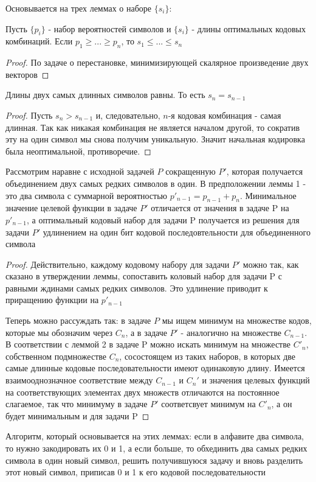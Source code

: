 \documentclass[discrete.tex]{subfiles}
\begin{document}
\begin{sol}
  Основывается на трех леммах о наборе $\{s_i\}$:
  \begin{lemma}[1]
    Пусть $\{p_i\}$ - набор вероятностей символов и $\{s_i\}$ - длины оптимальных кодовых комбинаций. Если $p_1 \geq ... \geq p_n$, то $s_1 \leq ... \leq s_n$
  \end{lemma}

  \begin{proof}
    По задаче о перестановке, минимизирующей скалярное произведение двух векторов
  \end{proof}

  \begin{lemma}[2]
    Длины двух самых длинных символов равны. То есть $s_n = s_{n-1}$
  \end{lemma}

  \begin{proof}
    Пусть $s_n > s_{n-1}$ и, следовательно, $n$-я кодовая комбинация - самая длинная. Так как никакая комбинация не является началом другой, то сократив эту на один символ мы снова получим уникальную. Значит начальная кодировка была неоптимальной, противоречие.
  \end{proof}

  \begin{lemma}[3]
    Рассмотрим наравне с исходной задачей $P$ сокращенную $P'$,  которая получается объединением двух самых редких символов в один. В предположении леммы 1 - это два символа с суммарной вероятностью $p'_{n-1} = p_{n-1} + p_n$. Минимальное значение целевой функции в задаче $P'$ отличается от значения в задаче P на $p'_{n-1}$, а оптимальный кодовый набор для задачи P получается из решения для задачи $P'$ удлинением на один бит кодовой последовтельности для объединенного символа
  \end{lemma}

  \begin{proof}
    Действительно, каждому кодовому набору для задачи $P'$ можно так, как сказано в утверждении леммы, сопоставить коловый набор для задачи P с равными ждинами самых редких символов. Это удлинение приводит к приращению функции на $p'_{n-1}$

    Теперь можно рассуждать так: в задаче $P$ мы ищем минимум на множестве кодов, которые мы обозначим через $C_n$, а в задаче $P'$ - аналогично на множестве $C_{n-1}$. В соответствии с леммой 2 в задаче P можно искать минимум на множестве $C'_n$, собственном подмножестве $C_n$, сосостоящем из таких наборов, в которых две самые длинные кодовые последовательности имеют одинаковую длину. Имеется взаимооднозначное соответствие между $C_{n-1}$ и $C_n'$ и значения целевых функций на соответствующих элементах двух множеств отличаются на постоянное слагаемое, так что минимуму в задаче $P'$ соответсвует минимум на $C'_n$, а он будет минимальным и для задачи P
  \end{proof}

  Алгоритм, который основывается на этих леммах: если в алфавите два символа, то нужно закодировать их 0 и 1, а если больше, то обхединить два самых редких символа в один новый символ, решить получившуюся задачу и вновь разделить этот новый символ, приписав 0 и 1 к его кодовой последовательности
\end{sol}
\end{document}
